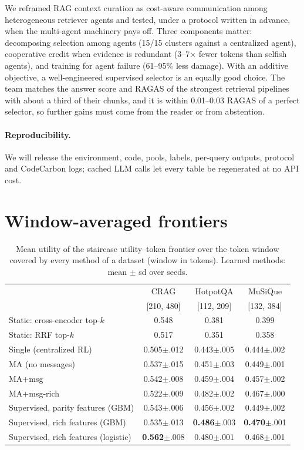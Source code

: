 \documentclass[sigconf,anonymous]{aamas}
\theoremstyle{plain}
\theoremstyle{definition}
\begin{document}
We reframed RAG context curation as cost-aware communication among heterogeneous retriever agents and tested, under a protocol written in advance, when the multi-agent machinery pays off. Three components matter: decomposing selection among agents (15/15 clusters against a centralized agent), cooperative credit when evidence is redundant (3--7$\times$ fewer tokens than selfish agents), and training for agent failure (61--95\% less damage). With an additive objective, a well-engineered supervised selector is an equally good choice. The team matches the answer score and RAGAS of the strongest retrieval pipelines with about a third of their chunks, and it is within 0.01--0.03 RAGAS of a perfect selector, so further gains must come from the reader or from abstention.

\paragraph{Reproducibility.}
We will release the environment, code, pools, labels, per-query outputs, protocol and CodeCarbon logs; cached LLM calls let every table be regenerated at no API cost.




\appendix
\section{Window-averaged frontiers}\label{app:frontier}

\begin{table}[h]
\centering\small
\caption{Mean utility of the staircase utility--token frontier over the token window covered by every method of a dataset (window in tokens). Learned methods: mean $\pm$ sd over seeds.}
\label{tab:frontier-auc}
\setlength{\tabcolsep}{3pt}
\begin{tabular}{l ccc}
\toprule
 & CRAG & HotpotQA & MuSiQue \\
 & [210, 480] & [112, 209] & [132, 384] \\
\midrule
Static: cross-encoder top-$k$ & 0.548 & 0.381 & 0.399 \\
Static: RRF top-$k$ & 0.517 & 0.351 & 0.358 \\
Single (centralized RL) & 0.505$\pm$.012 & 0.443$\pm$.005 & 0.444$\pm$.002 \\
MA (no messages) & 0.537$\pm$.015 & 0.451$\pm$.003 & 0.449$\pm$.001 \\
MA+msg & 0.542$\pm$.008 & 0.459$\pm$.004 & 0.457$\pm$.002 \\
MA+msg-rich & 0.522$\pm$.009 & 0.482$\pm$.002 & 0.467$\pm$.000 \\
\midrule
Supervised, parity features (GBM) & 0.543$\pm$.006 & 0.456$\pm$.002 & 0.449$\pm$.002 \\
Supervised, rich features (GBM) & 0.535$\pm$.013 & \textbf{0.486}$\pm$.003 & \textbf{0.470}$\pm$.001 \\
Supervised, rich features (logistic) & \textbf{0.562}$\pm$.008 & 0.480$\pm$.001 & 0.468$\pm$.001 \\
\bottomrule
\end{tabular}
\end{table}
\end{document}
